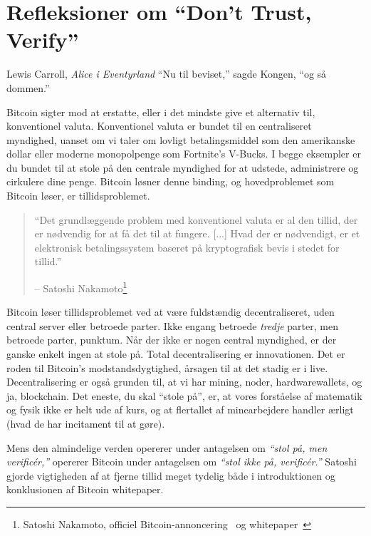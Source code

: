 \chapter{Refleksioner om \enquote{Don't Trust, Verify}}
\label{les:16}

\begin{chapquote}{Lewis Carroll, \textit{Alice i Eventyrland}}
\enquote{Nu til beviset,} sagde Kongen, \enquote{og så dommen.}
\end{chapquote}

Bitcoin sigter mod at erstatte, eller i det mindste give et alternativ til,
konventionel valuta. Konventionel valuta er bundet til en centraliseret
myndighed, uanset om vi taler om lovligt betalingsmiddel som den amerikanske
dollar eller moderne monopolpenge som Fortnite's V-Bucks. I begge
eksempler er du bundet til at stole på den centrale myndighed for at udstede, 
administrere og cirkulere dine penge. Bitcoin løsner denne binding, og 
hovedproblemet som Bitcoin løser, er tillidsproblemet.

\begin{quotation}\begin{samepage}
\enquote{Det grundlæggende problem med konventionel valuta er al den tillid, 
der er nødvendig for at få det til at fungere. [...] Hvad der er nødvendigt, 
er et elektronisk betalingssystem baseret på kryptografisk bevis i stedet for 
tillid.} \begin{flushright} -- Satoshi Nakamoto\footnote{Satoshi Nakamoto,
  officiel Bitcoin-annoncering~\cite{bitcoin-announcement} og 
  whitepaper~\cite{whitepaper}}
\end{flushright}\end{samepage}\end{quotation}

Bitcoin løser tillidsproblemet ved at være fuldstændig decentraliseret,
uden central server eller betroede parter. Ikke engang betroede \textit{tredje}
parter, men betroede parter, punktum. Når der ikke er nogen central
myndighed, er der ganske enkelt ingen at stole på. Total decentralisering
er innovationen. Det er roden til Bitcoin's modstandsdygtighed, årsagen
til at det stadig er i live. Decentralisering er også grunden til, at vi har 
mining, noder, hardwarewallets, og ja, blockchain. Det eneste, du
skal \enquote{stole på}, er, at vores forståelse af matematik og fysik
ikke er helt ude af kurs, og at flertallet af minearbejdere handler ærligt 
(hvad de har incitament til at gøre).

Mens den almindelige verden opererer under antagelsen om \textit{\enquote{stol
på, men verificér,}} opererer Bitcoin under antagelsen om \textit{\enquote{stol
ikke på, verificér.}} Satoshi gjorde vigtigheden af at fjerne tillid meget 
tydelig både i introduktionen og konklusionen af Bitcoin whitepaper.

